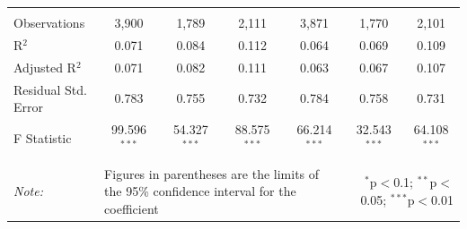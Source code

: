 \documentclass[alpha-refs]{wiley-article-01g}
\begin{document}
\begin{landscape}
\begin{table}[!htbp]
\begin{tabular}{@{\extracolsep{5pt}}lcccccc}
  & & & & & & \\ 
\hline \\[-3ex] 
Observations & 3,900 & 1,789 & 2,111 & 3,871 & 1,770 & 2,101 \\ 
R$^{2}$ & 0.071 & 0.084 & 0.112 & 0.064 & 0.069 & 0.109 \\ 
Adjusted R$^{2}$ & 0.071 & 0.082 & 0.111 & 0.063 & 0.067 & 0.107 \\ 
Residual Std. Error & 0.783 & 0.755 & 0.732 & 0.784 & 0.758 & 0.731 \\ 
F Statistic & 99.596$^{***}$ & 54.327$^{***}$ & 88.575$^{***}$ & 66.214$^{***}$ & 32.543$^{***}$ & 64.108$^{***}$ \\ 
\hline 
\hline \\[-3ex] 
\textit{Note:} &\multicolumn{4}{l}{Figures in parentheses are the limits of the 95\% confidence interval for the coefficient}  & \multicolumn{2}{r}{$^{*}$p$<$0.1; $^{**}$p$<$0.05; $^{***}$p$<$0.01} \\ 
\end{tabular} 
\end{table} 

\end{landscape}

\newpage
\end{document}
